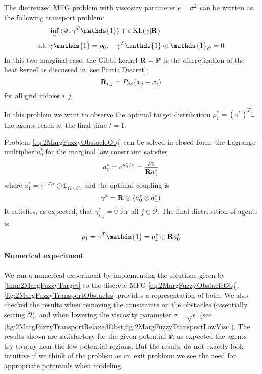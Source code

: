 \documentclass[../report.tex]{subfiles}
\begin{document}
The discretized MFG problem with viscosity parameter $\epsilon = \sigma^2$ can be written as the following transport problem:
\begin{equation}\label{eq:2MargFuzzyObstacleObj}
\begin{aligned}
	&\inf_\gamma{} \langle \Psi, \gamma^T\mathds{1}\rangle + \epsilon \KL(\gamma | \bfR) \\
	\suchthat\ & \gamma\mathds{1} = \rho_0, \quad \gamma^T\mathds{1} \odot \mathds{1}_{\mathscr{O}} = 0
	\end{aligned}
\end{equation}
In this two-marginal case, the Gibbs kernel $\mathbf{R} = \mathbf{P}$ is the discretization of the heat kernel as discussed in \cref{sec:PartialDiscret}:
\[
	\mathbf{R}_{i,j} = P_{h\varepsilon}(x_j - x_i)
\]
for all grid indices $i,j$.



In this problem we want to observe the optimal target distribution $\rho^*_1 = (\gamma^*)^T\mathds{1}$ the agents reach at the final time $t=1$.

\begin{prop}\label{thm:2MargFuzzyTarget}
Problem \eqref{eq:2MargFuzzyObstacleObj} can be solved in closed form: the Lagrange multiplier $u_0^*$ for the marginal law constraint satisfies
\[
	a_0^* = e^{u_0^*/\varepsilon}  = \frac{\rho_0}{\mathbf{R} a^*_1}
\]
where $a^*_1 = e^{-\Psi/\epsilon}\odot\mathds{1}_{\Omega\backslash\mathscr{O}}$, and the optimal coupling is
\[
	\gamma^* = \mathbf{R}\odot (a_0^* \otimes a_1^*)	
\]
It satisfies, as expected, that $\gamma^*_{i,j} = 0$ for all $j\in\mathscr{O}$. The final distribution of agents is
\[
	\rho_1 = \gamma^T\mathds{1} = a_1^* \odot \bfR a_0^*
\]
\end{prop}
 
\paragraph{Numerical experiment} We ran a numerical experiment by implementing the solutions given by \cref{thm:2MargFuzzyTarget} to the discrete MFG \eqref{eq:2MargFuzzyObstacleObj}. \cref{fig:2MargFuzzyTransportObstacles} provides a representation of both. We also checked the results when removing the constraints on the obstacles (essentially setting $\mathscr{O}$), and when lowering the viscosity parameter $\sigma = \sqrt{\epsilon}$ (see \cref{fig:2MargFuzzyTransportRelaxedObst,fig:2MargFuzzyTransportLowVisc}). The results shown are satisfactory for the given potential $\Psi$: as expected the agents try to stay near the low-potential regions. But the results do not exactly look intuitive if we think of the problem as an exit problem: we see the need for appropriate potentials when modeling.
\end{document}

